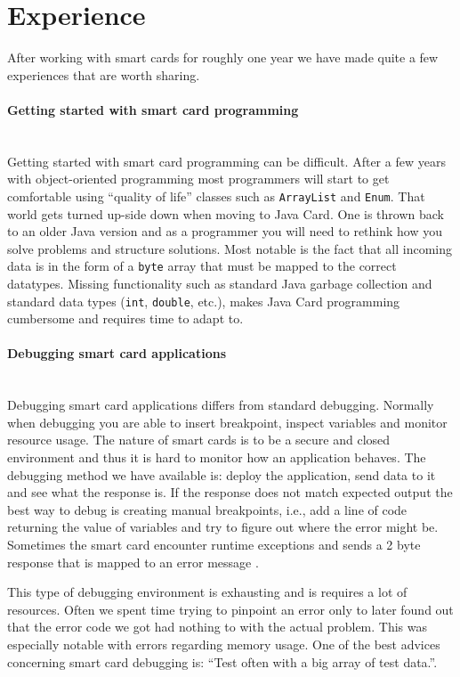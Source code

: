 \section{Experience}
After working with smart cards for roughly one year we have made quite a few experiences that are worth sharing.

\paragraph{Getting started with smart card programming}\mbox{}\\
Getting started with smart card programming can be difficult. After a few years with object-oriented programming most programmers will start to get comfortable using ``quality of life'' classes such as \texttt{ArrayList} and \texttt{Enum}. That world gets turned up-side down when moving to Java Card. One is  thrown back to an older Java version and as a programmer you will need to rethink how you solve problems and structure solutions. Most notable is the fact that all incoming data is in the form of a \texttt{byte} array that must be mapped to the correct datatypes. Missing functionality such as standard Java garbage collection and standard data types (\texttt{int}, \texttt{double}, etc.), makes Java Card programming cumbersome and requires time to adapt to.

\paragraph{Debugging smart card applications}\mbox{}\\
Debugging smart card applications differs from standard debugging. Normally when debugging you are able to insert breakpoint, inspect variables and monitor resource usage. The nature of smart cards is to be a secure and closed environment and thus it is hard to monitor how an application behaves. The debugging method we have available is: deploy the application, send data to it and see what the response is. If the response does not match expected output the best way to debug is creating manual breakpoints, i.e., add a line of code returning the value of variables and try to figure out where the error might be. Sometimes the smart card encounter runtime exceptions and sends a 2 byte response that is mapped to an error message \cite{javacardErrors}.

This type of debugging environment is exhausting and is requires a lot of resources. Often we spent time trying to pinpoint an error only to later found out that the error code we got had nothing to with the actual problem. This was especially notable with errors regarding memory usage. One of the best advices concerning smart card debugging is: ``Test often with a big array of test data.''.

